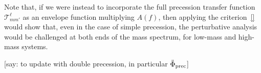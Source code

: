 \documentclass[aps,showpacs,twocolumn,
prd,superscriptaddress,nofootinbib]{revtex4-1}
\newcommand\calT{{\mathcal{T}}}
\newcommand{\SM}[1]{{\color{Red} #1}}
\begin{document}
Note that, if we were instead to incorporate the full precession transfer function $\calT^{\ell}_{mm'}$ as an envelope function multiplying $A(f)$, then applying the criterion~\eqref{} would show that, even in the case of simple precession, the perturbative analysis would be challenged at both ends of the mass spectrum, for low-mass and high-mass systems.

\SM{[say: to update with double precession, in particular $\ddot{\Phi}_{\rm prec}$]}


%

\end{document}

